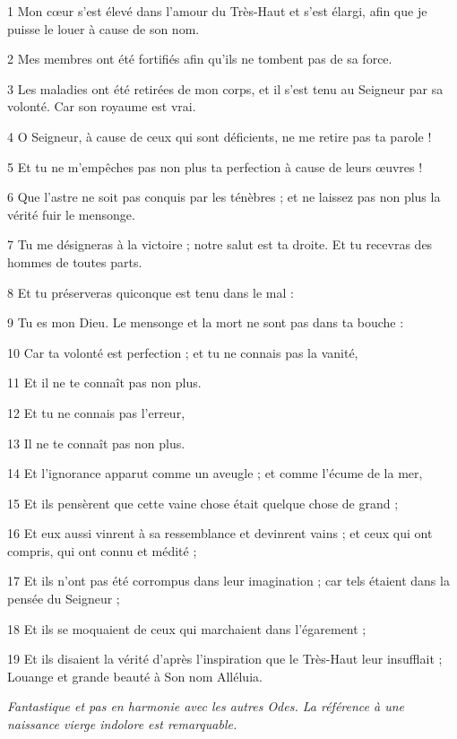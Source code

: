 \par 1 Mon cœur s'est élevé dans l'amour du Très-Haut et s'est élargi, afin que je puisse le louer à cause de son nom.
\par 2 Mes membres ont été fortifiés afin qu'ils ne tombent pas de sa force.
\par 3 Les maladies ont été retirées de mon corps, et il s'est tenu au Seigneur par sa volonté. Car son royaume est vrai.
\par 4 O Seigneur, à cause de ceux qui sont déficients, ne me retire pas ta parole !
\par 5 Et tu ne m'empêches pas non plus ta perfection à cause de leurs œuvres !
\par 6 Que l'astre ne soit pas conquis par les ténèbres ; et ne laissez pas non plus la vérité fuir le mensonge.
\par 7 Tu me désigneras à la victoire ; notre salut est ta droite. Et tu recevras des hommes de toutes parts.
\par 8 Et tu préserveras quiconque est tenu dans le mal :
\par 9 Tu es mon Dieu. Le mensonge et la mort ne sont pas dans ta bouche :
\par 10 Car ta volonté est perfection ; et tu ne connais pas la vanité,
\par 11 Et il ne te connaît pas non plus.
\par 12 Et tu ne connais pas l'erreur,
\par 13 Il ne te connaît pas non plus.
\par 14 Et l'ignorance apparut comme un aveugle ; et comme l'écume de la mer,
\par 15 Et ils pensèrent que cette vaine chose était quelque chose de grand ;
\par 16 Et eux aussi vinrent à sa ressemblance et devinrent vains ; et ceux qui ont compris, qui ont connu et médité ;
\par 17 Et ils n'ont pas été corrompus dans leur imagination ; car tels étaient dans la pensée du Seigneur ;
\par 18 Et ils se moquaient de ceux qui marchaient dans l'égarement ;
\par 19 Et ils disaient la vérité d'après l'inspiration que le Très-Haut leur insufflait ; Louange et grande beauté à Son nom Alléluia.


\par \textit{Fantastique et pas en harmonie avec les autres Odes. La référence à une naissance vierge indolore est remarquable.}


